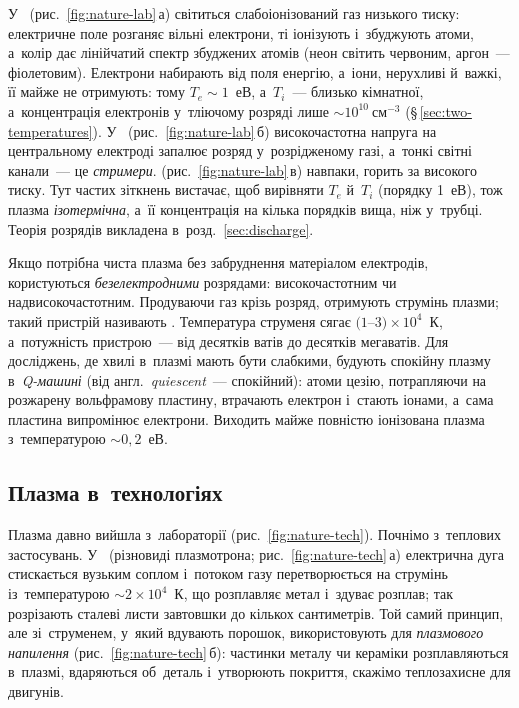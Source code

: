 У~ (рис.~\ref{fig:nature-lab}\,а) світиться слабоіонізований газ низького тиску: електричне поле розганяє вільні електрони, ті іонізують і~збуджують атоми,
а~колір дає лінійчатий спектр збуджених атомів (неон світить червоним, аргон~--- фіолетовим). Електрони набирають від поля енергію, а~іони, нерухливі й~важкі, її майже не отримують:
тому $T_e\sim1$~еВ, а~$T_i$~--- близько кімнатної, а~концентрація електронів у~тліючому розряді лише $\sim10^{10}~\mathrm{см}^{-3}$ (§\,\ref{sec:two-temperatures}). У~
(рис.~\ref{fig:nature-lab}\,б) високочастотна напруга на центральному електроді запалює розряд у~розрідженому газі, а~тонкі світні канали~--- це \emph{стримери}.
 (рис.~\ref{fig:nature-lab}\,в) навпаки, горить за високого тиску. Тут частих зіткнень вистачає, щоб вирівняти $T_e$ й~$T_i$ (порядку 1~еВ), тож плазма \emph{ізотермічна}, а~її
концентрація на кілька порядків вища, ніж у~трубці. Теорія розрядів викладена в~розд.~\ref{sec:discharge}.

Якщо потрібна чиста плазма без забруднення матеріалом електродів, користуються \emph{безелектродними} розрядами: високочастотним чи надвисокочастотним.
Продуваючи газ крізь розряд, отримують струмінь плазми; такий пристрій називають . Температура струменя сягає $(1$--$3)\times10^4$~К, а~потужність пристрою~--- від десятків ватів до десятків мегаватів.
Для досліджень, де хвилі в~плазмі мають бути слабкими, будують спокійну плазму в~\emph{Q-машині} (від англ.\ \emph{quiescent}~--- спокійний): атоми цезію, потрапляючи на розжарену вольфрамову пластину, втрачають електрон і~стають
іонами, а~сама пластина випромінює електрони. Виходить майже повністю іонізована плазма з~температурою $\sim0{,}2$~еВ.

\subsection*{Плазма в~технологіях}

Плазма давно вийшла з~лабораторії (рис.~\ref{fig:nature-tech}). Почнімо з~теплових застосувань. У~ (різновиді плазмотрона; рис.~\ref{fig:nature-tech}\,а)
електрична дуга стискається вузьким соплом і~потоком газу перетворюється на струмінь із~температурою $\sim2\times10^{4}$~К, що розплавляє метал і~здуває розплав;
так розрізають сталеві листи завтовшки до кількох сантиметрів. Той самий принцип, але зі~струменем, у~який вдувають порошок, використовують для \emph{плазмового напилення}
(рис.~\ref{fig:nature-tech}\,б): частинки металу чи кераміки розплавляються в~плазмі, вдаряються об~деталь і~утворюють покриття, скажімо теплозахисне для двигунів.


